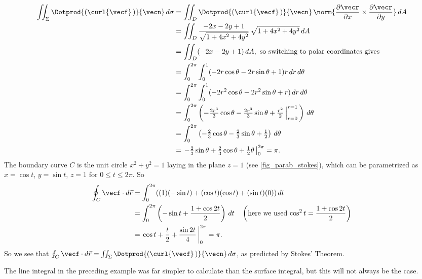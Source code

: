 { \begin{align*}
  \iint_{\Sigma} \Dotprod{(\curl{\vecf}\,)}{\vecn}\,d\sigma &=
   \iint_{D} \Dotprod{(\curl{\vecf}\,)}{\vecn}\,
   \norm{\frac{\partial \vecr}{\partial x}\times\frac{\partial \vecr}{\partial y}}\,dA\\
   &= \iint_{D} \frac{-2x-2y+1}{\sqrt{1 + 4x^2 + 4y^2}}\,\sqrt{1 + 4x^2 + 4y^2}\,dA\\
   &= \iint_{D} (-2x-2y+1)\,dA ,\text{ so switching to polar coordinates gives}\\
   &= \int_0^{2\pi} \int_0^1 (-2r\cos \theta - 2r\sin \theta + 1)r\,dr\,d\theta\\
   &= \int_0^{2\pi} \int_0^1 (-2r^2 \cos \theta - 2r^2 \sin \theta + r)\,dr\,d\theta\\
   &= \int_0^{2\pi} \left( -\tfrac{2r^3}{3} \cos \theta - \tfrac{2r^3}{3} \sin \theta +
   \tfrac{r^2}{2}\,\Big|_{r=0}^{r=1} \,\right)\,d\theta\\
   &= \int_0^{2\pi} \left( -\tfrac{2}{3} \cos \theta - \tfrac{2}{3} \sin \theta + \tfrac{1}{2} \right)\,d\theta\\
   &= \left.-\tfrac{2}{3} \sin \theta + \tfrac{2}{3} \cos \theta + \tfrac{1}{2}\theta\,\right|_0^{2\pi} = \pi .
 \end{align*}
 The boundary curve $C$ is the unit circle $x^2 + y^2 =1$ laying in the plane $z=1$ (see \autoref{fig_parab_stokes}), which can be parametrized as $x = \cos t$, $y = \sin t$, $z = 1$ for $0 \le t \le 2\pi$. So
 \begin{align*}
  \oint_C\vecf\cdot d\vec{r} &= \int_0^{2\pi} ((1)(-\sin t) + (\cos t)(\cos t) + (\sin t)(0))\,dt\\
   &= \int_0^{2\pi} \left( -\sin t + \frac{1+\cos 2t}{2} \right) \,dt \quad \left( \text{here we used $\cos^2 t =
   \frac{1+\cos 2t}{2}$} \right)\\
   &= \left.\cos t + \frac{t}{2} + \frac{\sin 2t}{4}\,\right|_0^{2\pi} = \pi .
 \end{align*}
 So we see that $\oint_C\vecf\cdot d\vec{r}=\iint_{\Sigma} \Dotprod{(\curl{\vecf}\,)}{\vecn} \,d\sigma$, as predicted by Stokes' Theorem.}

The line integral in the preceding example was far simpler to calculate than the surface integral, but this will not always be the case.

